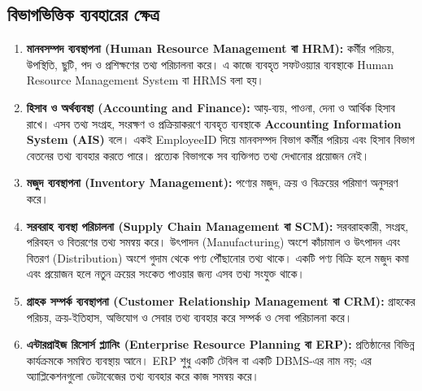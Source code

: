 \subsection{বিভাগভিত্তিক ব্যবহারের ক্ষেত্র}
\begin{enumerate}
\item \textbf{মানবসম্পদ ব্যবস্থাপনা (Human Resource Management বা HRM):} কর্মীর পরিচয়, উপস্থিতি, ছুটি, পদ ও প্রশিক্ষণের তথ্য পরিচালনা করে। এ কাজে ব্যবহৃত সফটওয়্যার ব্যবস্থাকে Human Resource Management System বা HRMS বলা হয়।
\item \textbf{হিসাব ও অর্থব্যবস্থা (Accounting and Finance):} আয়-ব্যয়, পাওনা, দেনা ও আর্থিক হিসাব রাখে। এসব তথ্য সংগ্রহ, সংরক্ষণ ও প্রক্রিয়াকরণে ব্যবহৃত ব্যবস্থাকে \textbf{Accounting Information System (AIS)} বলে। একই EmployeeID দিয়ে মানবসম্পদ বিভাগ কর্মীর পরিচয় এবং হিসাব বিভাগ বেতনের তথ্য ব্যবহার করতে পারে। প্রত্যেক বিভাগকে সব ব্যক্তিগত তথ্য দেখানোর প্রয়োজন নেই।
\item \textbf{মজুদ ব্যবস্থাপনা (Inventory Management):} পণ্যের মজুদ, ক্রয় ও বিক্রয়ের পরিমাণ অনুসরণ করে।
\item \textbf{সরবরাহ ব্যবস্থা পরিচালনা (Supply Chain Management বা SCM):} সরবরাহকারী, সংগ্রহ, পরিবহন ও বিতরণের তথ্য সমন্বয় করে। উৎপাদন (Manufacturing) অংশে কাঁচামাল ও উৎপাদন এবং বিতরণ (Distribution) অংশে গুদাম থেকে পণ্য পৌঁছানোর তথ্য থাকে। একটি পণ্য বিক্রি হলে মজুদ কমা এবং প্রয়োজন হলে নতুন ক্রয়ের সংকেত পাওয়ার জন্য এসব তথ্য সংযুক্ত থাকে।
\item \textbf{গ্রাহক সম্পর্ক ব্যবস্থাপনা (Customer Relationship Management বা CRM):} গ্রাহকের পরিচয়, ক্রয়-ইতিহাস, অভিযোগ ও সেবার তথ্য ব্যবহার করে সম্পর্ক ও সেবা পরিচালনা করে।
\item \textbf{এন্টারপ্রাইজ রিসোর্স প্ল্যানিং (Enterprise Resource Planning বা ERP):} প্রতিষ্ঠানের বিভিন্ন কার্যক্রমকে সমন্বিত ব্যবস্থায় আনে। ERP শুধু একটি টেবিল বা একটি DBMS-এর নাম নয়; এর অ্যাপ্লিকেশনগুলো ডেটাবেজের তথ্য ব্যবহার করে কাজ সমন্বয় করে।
\end{enumerate}


